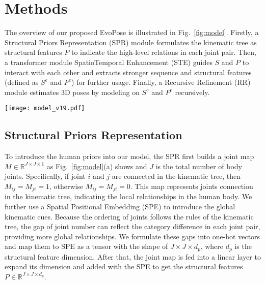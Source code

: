 \documentclass{article}
\begin{document}
\section{Methods}The overview of our proposed EvoPose is illustrated in Fig.~\ref{fig:model}. Firstly, 
a Structural Priors Representation (SPR) module formulates
the kinematic tree as structural features $P$ to indicate the high-level relations in each joint pair. Then, a transformer module SpatioTemporal Enhancement (STE) guides $S$ and $P$ to interact with each other and extracts stronger sequence and structural features (defined as $S^e$ and $P^e$) for further usage. Finally, a Recursive Refinement (RR) module estimates 3D poses by modeling on $S^e$ and $P^e$ recursively.\begin{figure*}[ht]
  \setlength{\abovecaptionskip}{0cm}
  \setlength{\belowcaptionskip}{-0.3cm}
  \centering
\centerline{\texttt{[image: model\_v19.pdf]}}
\caption{{\bf (a)} Overview of the proposed EvoPose. Structural Priors Representation (SPR) derives structural features from the kinematic tree. SpatioTemporal Enhancement (STE) models spatiotemporal relations and enhances structural features. {\bf (b)} Overview of STEvo in STE. {\bf (c)} Overview of the Recursive Refinement (RR) which refines the estimated result auto-regressively.}
\label{fig:model}\end{figure*}

\subsection{Structural Priors Representation}To introduce the human priors into our model, the SPR first builds a joint map $M\in\mathbb R^{J\times J\times 1}$ as Fig.~\ref{fig:model}(a) shows and $J$ is the total number of body joints. Specifically, if joint $i$ and $j$ are connected in the kinematic tree, then $M_{ij}=M_{ji}=1$, otherwise $M_{ij}=M_{ji}=0$. This map represents joints connection in the kinematic tree, indicating the local relationships in the human body. We further use a Spatial Positional Embedding (SPE) to introduce the global kinematic cues. Because the ordering of joints follows the rules of the kinematic tree, the gap of joint number can reflect the category difference in each joint pair, providing more global relationships. We formulate these gaps into one-hot vectors and map them to SPE as a tensor with the shape of $J\times J\times d_p$, where $d_p$ is the structural feature dimension. After that, the joint map is fed into a linear layer to expand its dimension and added with the SPE to get the structural features $P\in\mathbb R^{J\times J\times d_p}$.
\end{document}
